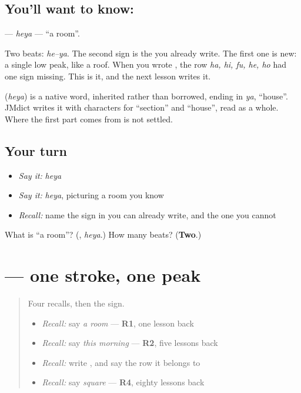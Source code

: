 \subsection*{You'll want to know: }
\textbf{} — \emph{heya} — \textquotedblleft{}a room\textquotedblright{}.

Two beats: \emph{he–ya}. The second sign is the \textbf{} you already write. The first one is new: a single low peak, like a roof. When you wrote \textbf{}, the row \emph{ha, hi, fu, he, ho} had one sign missing. This is it, and the next lesson writes it.

\begin{cousinweb}
\textbf{} (\emph{heya}) is a native word, inherited rather than borrowed, ending in \emph{ya}, \textquotedblleft{}house\textquotedblright{}. JMdict writes it with characters for \textquotedblleft{}section\textquotedblright{} and \textquotedblleft{}house\textquotedblright{}, read as a whole. Where the first part comes from is not settled.
\end{cousinweb}

\subsection*{Your turn}
\begin{itemize}
\raggedright
  \item \emph{Say it:} \emph{heya}
  \item \emph{Say it:} \emph{heya}, picturing a room you know
  \item \emph{Recall:} name the sign in \textbf{} you can already write, and the one you cannot
\end{itemize}

\begin{tcolorbox}[breakable,colback=teal!4,colframe=teal!35!black,title={Before you move on}]
What is \textquotedblleft{}a room\textquotedblright{}? (\textbf{}, \emph{heya}.) How many beats? (\textbf{Two}.)
\end{tcolorbox}
\section[\texorpdfstring{\ja{へ} (he)}{へ (he)}]{ — one stroke, one peak}

\label{lesson:JA-W133-he}



\begin{quote}
Four recalls, then the sign.

\begin{itemize}
\raggedright
  \item \emph{Recall:} say \emph{a room} — \textbf{R1}, one lesson back
  \item \emph{Recall:} say \emph{this morning} — \textbf{R2}, five lessons back
  \item \emph{Recall:} write \textbf{}, and say the row it belongs to
  \item \emph{Recall:} say \emph{square} — \textbf{R4}, eighty lessons back
\end{itemize}
\end{quote}

